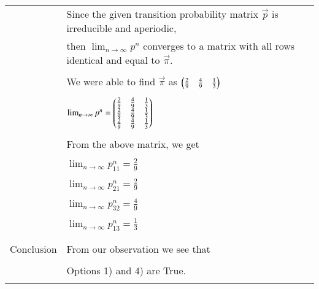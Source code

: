 \documentclass[journal,12pt]{IEEEtran}
\begin{document}
\begin{longtable}{|l|l|}
		
		& Since the given transition probability matrix $\vec{p}$ is irreducible and aperiodic, \\
		& then $\lim_{n \to \infty} p^{n}$ converges to a matrix with all rows identical and equal to $\vec{\pi}$. \\
		& \\
		& We were able to find $\vec{\pi}$ as $\begin{pmatrix}\frac{2}{9} & \frac{4}{9} & \frac{1}{3}\end{pmatrix}$ \\
		& \\
		& $\lim_{n \to \infty} p^{n} = \begin{pmatrix}\frac{2}{9}&\frac{4}{9}&\frac{1}{3}\\\frac{2}{9}&\frac{4}{9}&\frac{1}{3}\\\frac{2}{9}&\frac{4}{9}&\frac{1}{3}\end{pmatrix}$\\
		& \\
		& From the above matrix, we get \\
		& \\
		& $\lim_{n \to \infty} p^{n}_{11} = \frac{2}{9}$ \\
		&\\
		& $\lim_{n \to \infty} p^{n}_{21} = \frac{2}{9}$ \\
		&\\
		& $\lim_{n \to \infty} p^{n}_{32} = \frac{4}{9}$ \\
		&\\
		& $\lim_{n \to \infty} p^{n}_{13} = \frac{1}{3}$ \\
		&\\
		\hline
		\multirow{3}{*}{Conclusion} & \\
		& From our observation we see that \\
		&\\
		& Options 1) and 4) are True.\\
		& \\
		\hline
	\end{longtable}
\end{document}
